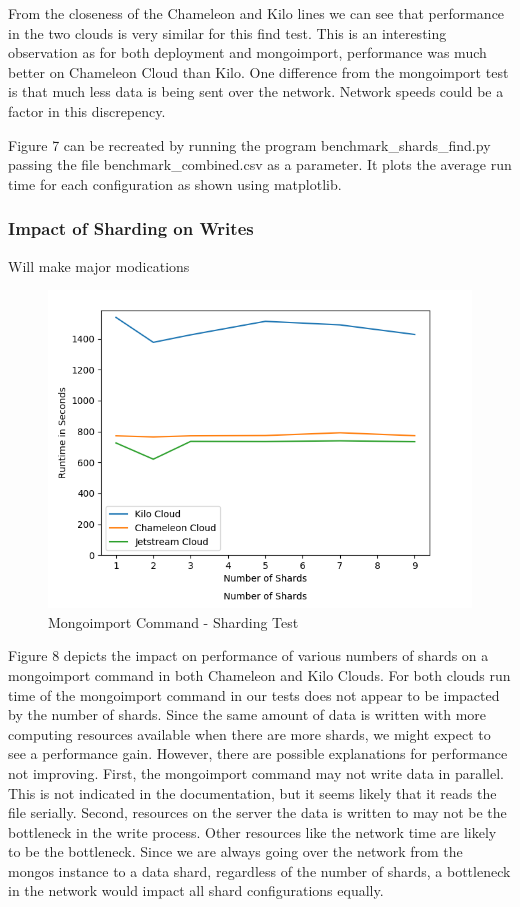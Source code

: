 \documentclass[9pt,twocolumn,twoside]{styles/osajnl}
\begin{document}
From the closeness of the Chameleon and Kilo lines we can see that performance in the two clouds is very similar for this find test.  This is an interesting observation as for both deployment and mongoimport, performance was much better on Chameleon Cloud than Kilo.  One difference from the mongoimport test is that much less data is being sent over the network.  Network speeds could be a factor in this discrepency.

Figure 7 can be recreated by running the program benchmark\_shards\_find.py passing the file benchmark\_combined.csv as a parameter.  It plots the average run time for each configuration as shown using matplotlib.



\subsubsection{Impact of Sharding on Writes}

Will make major modications

\begin{figure}[!ht]
  \includegraphics[scale=0.45]{images/shard_import.png}
  \caption{Mongoimport Command - Sharding Test}
\end{figure}


Figure 8 depicts the impact on performance of various numbers of shards on a mongoimport command in both Chameleon and Kilo Clouds.  For both clouds run time of the mongoimport command in our tests does not appear to be  impacted by the number of shards.  Since the same amount of data is written with more computing resources available when there are more shards, we might expect to see a performance gain.  However, there are possible explanations for performance not improving.  First, the mongoimport command may not write data in parallel.  This is not indicated in the documentation, but it seems likely that it reads the file serially.  Second, resources on the server the data is written to may not be the bottleneck in the write process.  Other resources like the network time are likely to be the bottleneck.  Since we are always going over the network from the mongos instance to a data shard, regardless of the number of shards, a bottleneck in the network would impact all shard configurations equally.
\end{document}
